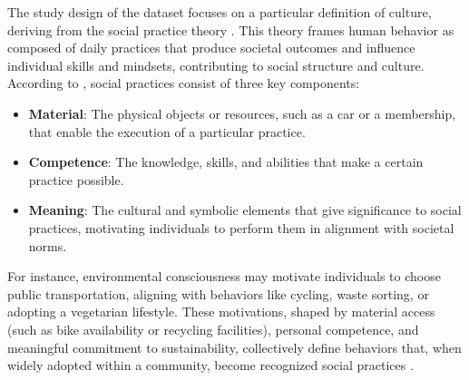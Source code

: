 The study design of the \dataset dataset focuses on a particular definition of culture, deriving from the social practice theory \cite{wittgenstein1953philosophical,goffman1975asylums,giddens1979central,giddens1984society,bourdieu1977outline,bourdieu1990logic,Dreyfus1991world,schatzki2001practice,reckwitz2002toward}. This theory frames human behavior as composed of daily practices that produce societal outcomes and influence individual skills and mindsets, contributing to social structure and culture. According to \citet{shove2012dynamics}, social practices consist of three key components:

\begin{itemize}
\item \textbf{Material}: The physical objects or resources, such as a car or a membership, that enable the execution of a particular practice.
\item \textbf{Competence}: The knowledge, skills, and abilities that make a certain practice possible.
\item \textbf{Meaning}: The cultural and symbolic elements that give significance to social practices, motivating individuals to perform them in alignment with societal norms.
\end{itemize}
\noindent
For instance, environmental consciousness may motivate individuals to choose public transportation, aligning with behaviors like cycling, waste sorting, or adopting a vegetarian lifestyle. These motivations, shaped by material access (such as bike availability or recycling facilities), personal competence, and meaningful commitment to sustainability, collectively define behaviors that, when widely adopted within a community, become recognized social practices \cite{shove2005consumers,ropke2009theories}. 


